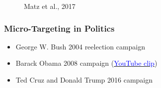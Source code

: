 \documentclass{beamer}
\begin{document}
\begin{frame}
{\begin{figure}
            \caption{Matz et al., 2017}
        \end{figure}
    }

\end{frame}


\begin{frame}
    \frametitle{Micro-Targeting in Politics}
    \begin{itemize}
        \item George W. Bush 2004 reelection campaign
        \item Barack Obama 2008 campaign (\href{https://www.youtube.com/watch?time_continue=7&v=BiQwcFRUg_8}{\textcolor{blue}{YouTube clip}})
        \item Ted Cruz and Donald Trump 2016 campaign
    \end{itemize}
\end{frame}
\end{document}
